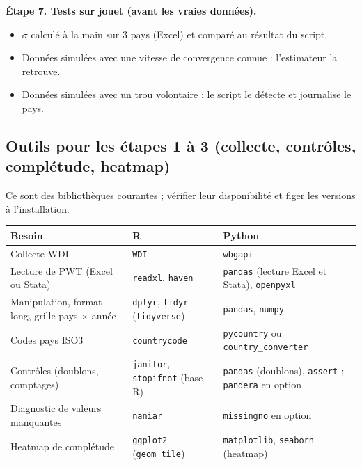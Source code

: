 \documentclass[21pt,a4paper]{article}
\newcommand{\sig}{\texorpdfstring{$\sigma$}{sigma}}
\begin{document}
	\textbf{Étape 7. Tests sur jouet (avant les vraies données).}
	\begin{itemize}
		\item \sig{} calculé à la main sur 3 pays (Excel) et comparé au résultat du script.
		\item Données simulées avec une vitesse de convergence connue : l'estimateur la retrouve.
		\item Données simulées avec un trou volontaire : le script le détecte et journalise le pays.
	\end{itemize}
	
	\subsection{Outils pour les étapes 1 à 3 (collecte, contrôles, complétude, heatmap)}
	
	Ce sont des bibliothèques courantes ; vérifier leur disponibilité et figer les versions à l'installation.
	
	\begin{center}
		\small
		\begin{tabularx}{\textwidth}{@{}L{4.6cm}L{4.4cm}Y@{}}
			\toprule
			\textbf{Besoin} & \textbf{R} & \textbf{Python} \\
			\midrule
			Collecte WDI & \texttt{WDI} & \texttt{wbgapi} \\
			\addlinespace
			Lecture de PWT (Excel ou Stata) & \texttt{readxl}, \texttt{haven} & \texttt{pandas} (lecture Excel et Stata), \texttt{openpyxl} \\
			\addlinespace
			Manipulation, format long, grille pays $\times$ année & \texttt{dplyr}, \texttt{tidyr} (\texttt{tidyverse}) & \texttt{pandas}, \texttt{numpy} \\
			\addlinespace
			Codes pays ISO3 & \texttt{countrycode} & \texttt{pycountry} ou \texttt{country\_converter} \\
			\addlinespace
			Contrôles (doublons, comptages) & \texttt{janitor}, \texttt{stopifnot} (base R) & \texttt{pandas} (doublons), \texttt{assert} ; \texttt{pandera} en option \\
			\addlinespace
			Diagnostic de valeurs manquantes & \texttt{naniar} & \texttt{missingno} en option \\
			\addlinespace
			Heatmap de complétude & \texttt{ggplot2} (\texttt{geom\_tile}) & \texttt{matplotlib}, \texttt{seaborn} (heatmap) \\
			\bottomrule
		\end{tabularx}
	\end{center}
	
\end{document}
